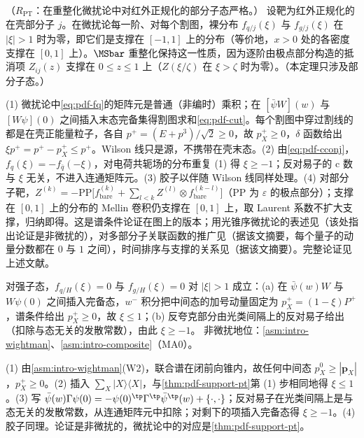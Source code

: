 \begin{theorem}\label{thm:pdf-support-pt}
（$R_{\mathrm{PT}}$：在重整化微扰论中对红外正规化的部分子态严格。）
设靶为红外正规化的在壳部分子 $j$。在微扰论每一阶、对每个割图，裸分布 $f_{q/j}(\xi)$ 与 $f_{g/j}(\xi)$ 在 $|\xi|>1$ 时为零，即它们是支撑在 $[-1,1]$ 上的分布（等价地，$x>0$ 处的各密度支撑在 $[0,1]$ 上）。$\MSbar$ 重整化保持这一性质，因为逐阶由极点部分构造的抵消项 $Z_{ij}(z)$ 支撑在 $0\le z\le1$ 上（$Z(\xi/\zeta)$ 在 $\xi>\zeta$ 时为零）。（本定理只涉及部分子态。）
\end{theorem}

\begin{proofsketch}
(1) 微扰论中\cref{eq:pdf-fq}的矩阵元是普通（非编时）乘积；在 $[\bar\psi W](w)$ 与 $[W\psi](0)$ 之间插入末态完备集得割图求和\cref{eq:pdf-cut}。每个割图中穿过割线的都是在壳正能量粒子，各自 $p^+=(E+p^3)/\sqrt2\ge0$，故 $p_X^+\ge0$，$\delta$ 函数给出 $\xi p^+=p^+-p_X^+\le p^+$。Wilson 线只是源，不携带在壳末态。(2) 由\cref{eq:pdf-cconj}，$f_q(\xi)=-f_{\bar q}(-\xi)$，对电荷共轭场的分布重复 (1) 得 $\xi\ge-1$；反对易子的 c 数与 $\xi$ 无关，不进入连通矩阵元。(3) 胶子以伴随 Wilson 线同样处理。(4) 对部分子靶，$Z^{(k)}=-\mathrm{PP}\big[f^{(k)}_{\mathrm{bare}}+\sum_{l<k}Z^{(l)}\otimes f^{(k-l)}_{\mathrm{bare}}\big]$（PP 为 $\varepsilon$ 的极点部分）；支撑在 $[0,1]$ 上的分布的 Mellin 卷积仍支撑在 $[0,1]$ 上，取 Laurent 系数不扩大支撑，归纳即得。这是谱条件论证在图上的版本；用光锥序微扰论的表述见\cite[第~6.9.3~节，第~191~页]{Collins2011}（该处指出论证是非微扰的），对多部分子关联函数的推广见\cite{Jaffe1983}（据该文摘要，每个量子的动量分数都在 $0$ 与 $1$ 之间），时间排序与支撑的关系见\cite{Diehl:1998sm}（据该文摘要）。完整论证见上述文献。
\end{proofsketch}

\begin{proposition}\label{prop:pdf-support-hadron}
对强子态，$f_{q/H}(\xi)=0$ 与 $f_{g/H}(\xi)=0$ 对 $|\xi|>1$ 成立：(a) 在 $\bar\psi(w)W$ 与 $W\psi(0)$ 之间插入完备态，$w^-$ 积分把中间态的加号动量固定为 $p_X^+=(1-\xi)P^+$，谱条件给出 $p_X^+\ge0$，故 $\xi\le1$；(b) 反夸克部分由光类间隔上的反对易子给出（扣除与态无关的发散常数），由此 $\xi\ge-1$。
非微扰地位：\cref{asm:intro-wightman}、\cref{asm:intro-composite}（MA0）。
\end{proposition}

\begin{proofsketch}
(1) 由\cref{asm:intro-wightman}(W2)，联合谱在闭前向锥内，故任何中间态 $p_X^0\ge|\bm p_X|$，$p_X^+\ge0$。(2) 插入 $\sum_X|X\rangle\langle X|$，与\cref{thm:pdf-support-pt}第 (1) 步相同地得 $\xi\le1$。(3) 写 $\bar\psi(w)\Gamma\psi(0)=-\psi(0)^{\tp}\Gamma^{\tp}\bar\psi^{\tp}(w)+\{\cdot,\cdot\}$；反对易子在光类间隔上是与态无关的发散常数，从连通矩阵元中扣除；对剩下的项插入完备态得 $\xi\ge-1$。(4) 胶子同理。论证是非微扰的\cite[第~6.9.3~节，第~191~页]{Collins2011}，微扰论中的对应是\cref{thm:pdf-support-pt}。
\end{proofsketch}

